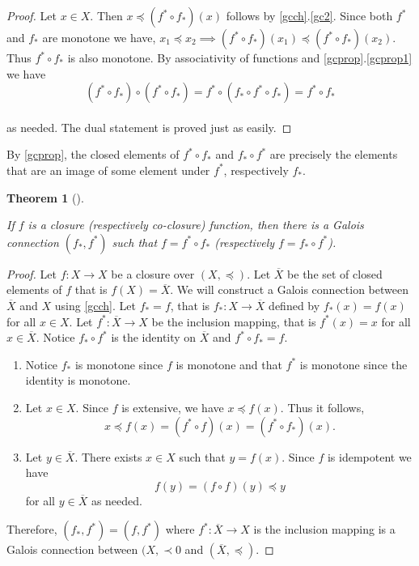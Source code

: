 \documentclass[
  letterpaper,
  10pt,
  reqno,
  twopage,
  openany]{book}
\providecommand{\tightlist}{%
  \setlength{\itemsep}{0pt}\setlength{\parskip}{0pt}}\usepackage{longtable,booktabs,array}
\theoremstyle{plain}
\theoremstyle{definition}
\theoremstyle{definition}
\theoremstyle{definition}
\theoremstyle{plain}
\theoremstyle{plain}
\newtheorem{theorem}{Theorem}[chapter]
\theoremstyle{remark}
\begin{document}
\begin{proof}

Let \(x\in X\). Then \(x\preceq (f^*\circ f_*)(x)\) follows by
\ref{gcch}.\eqref{gc2}. Since both \(f^*\) and \(f_*\) are monotone we
have,
\(x_1\preceq x_2 \implies (f^*\circ f_*)(x_1)\preceq (f^*\circ f_*)(x_2)\).
Thus \(f^*\circ f_*\) is also monotone. By associativity of functions
and \ref{gcprop}.\eqref{gcprop1} we have \[
(f^*\circ f_*)\circ (f^*\circ f_*)=f^*\circ (f_*\circ f^*\circ f_*)=f^*\circ f_*
\]\\
as needed. The dual statement is proved just as easily.

\end{proof}

By \ref{gcprop}, the closed elements of \(f^*\circ f_*\) and
\(f_*\circ f^*\) are precisely the elements that are an image of some
element under \(f^*\), respectively \(f_*\).

\leavevmode{}%
\begin{theorem}[]\label{thm-closure-function}

If \(f\) is a closure (respectively co-closure) function, then there is
a Galois connection \((f_*,f^*)\) such that \(f=f^*\circ f_*\)
(respectively \(f=f_*\circ f^*\)).

\end{theorem}

\begin{proof}

Let \(f:X\to X\) be a closure over \((X,\preceq)\). Let \(\overline{X}\)
be the set of closed elements of \(f\) that is \(f(X)=\overline{X}\). We
will construct a Galois connection between \(\overline{X}\) and \(X\)
using \ref{gcch}. Let \(f_*=f\), that is \(f_*:X\to \overline{X}\)
defined by \(f_*(x)=f(x)\) for all \(x\in X\). Let
\(f^*:\overline{X}\to X\) be the inclusion mapping, that is \(f^*(x)=x\)
for all \(x\in \overline{X}\). Notice \(f_*\circ f^*\) is the identity
on \(\overline{X}\) and \(f^*\circ f_*=f\).

\begin{enumerate}
\def\labelenumi{\arabic{enumi}.}
\tightlist
\item
  Notice \(f_*\) is monotone since \(f\) is monotone and that \(f^*\) is
  monotone since the identity is monotone.
\item
  Let \(x\in X\). Since \(f\) is extensive, we have \(x\preceq f(x)\).
  Thus it follows, \[
  x\preceq f(x)=(f^*\circ f)(x)=(f^*\circ f_*)(x).
  \]
\item
  Let \(y\in \overline{X}\). There exists \(x\in X\) such that
  \(y=f(x)\). Since \(f\) is idempotent we have \[
  f(y)=(f\circ f)(y)\preceq y
  \] for all \(y\in \overline{X}\) as needed.
\end{enumerate}

Therefore, \((f_*,f^*)=(f,f^*)\) where \(f^*:\overline{X}\to X\) is the
inclusion mapping is a Galois connection between \((X,\prec0\) and
\((\overline{X},\preceq)\).

\end{proof}
\end{document}
